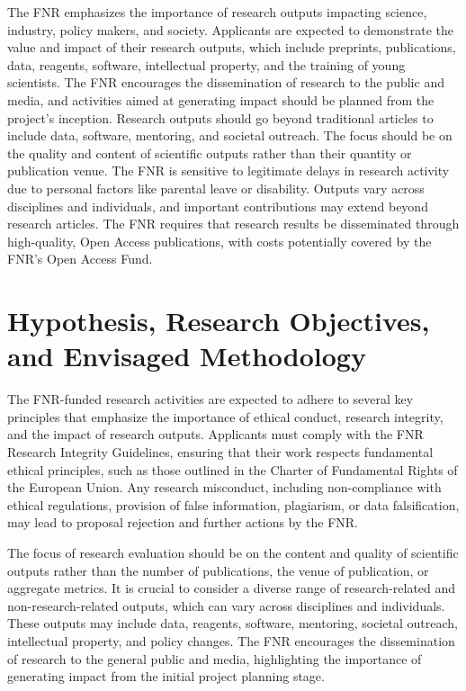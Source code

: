\documentclass{article}
\begin{document}
The FNR emphasizes the importance of research outputs impacting science, industry, policy makers, and society. Applicants are expected to demonstrate the value and impact of their research outputs, which include preprints, publications, data, reagents, software, intellectual property, and the training of young scientists. The FNR encourages the dissemination of research to the public and media, and activities aimed at generating impact should be planned from the project's inception. Research outputs should go beyond traditional articles to include data, software, mentoring, and societal outreach. The focus should be on the quality and content of scientific outputs rather than their quantity or publication venue. The FNR is sensitive to legitimate delays in research activity due to personal factors like parental leave or disability. Outputs vary across disciplines and individuals, and important contributions may extend beyond research articles. The FNR requires that research results be disseminated through high-quality, Open Access publications, with costs potentially covered by the FNR’s Open Access Fund.

\section{Hypothesis, Research Objectives, and Envisaged Methodology}

The FNR-funded research activities are expected to adhere to several key principles that emphasize the importance of ethical conduct, research integrity, and the impact of research outputs. Applicants must comply with the FNR Research Integrity Guidelines, ensuring that their work respects fundamental ethical principles, such as those outlined in the Charter of Fundamental Rights of the European Union. Any research misconduct, including non-compliance with ethical regulations, provision of false information, plagiarism, or data falsification, may lead to proposal rejection and further actions by the FNR.

The focus of research evaluation should be on the content and quality of scientific outputs rather than the number of publications, the venue of publication, or aggregate metrics. It is crucial to consider a diverse range of research-related and non-research-related outputs, which can vary across disciplines and individuals. These outputs may include data, reagents, software, mentoring, societal outreach, intellectual property, and policy changes. The FNR encourages the dissemination of research to the general public and media, highlighting the importance of generating impact from the initial project planning stage.
\end{document}
